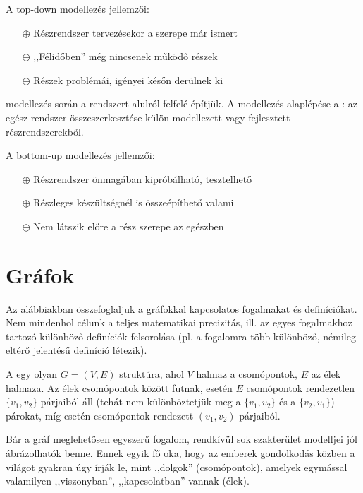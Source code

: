 A top-down modellezés jellemzői:

\begin{itemize}
\item[$\oplus$] Részrendszer tervezésekor a szerepe már ismert
\item[$\ominus$] ,,Félidőben'' még nincsenek működő részek
\item[$\ominus$] Részek problémái, igényei későn derülnek ki
\end{itemize}

\begin{definicio}
	 modellezés során a rendszert alulról felfelé építjük. A modellezés alaplépése a : az egész rendszer összeszerkesztése külön modellezett vagy fejlesztett részrendszerekből.
\end{definicio}

A bottom-up modellezés jellemzői:

\begin{itemize}
\item[$\oplus$] Részrendszer önmagában kipróbálható, tesztelhető
\item[$\oplus$] Részleges készültségnél is összeépíthető valami
\item[$\ominus$] Nem látszik előre a rész szerepe az egészben
\end{itemize}

\section{Gráfok}
\label{sec:graf}

Az alábbiakban összefoglaljuk a gráfokkal kapcsolatos fogalmakat és definíciókat. Nem mindenhol célunk a teljes matematikai precizitás, ill. az egyes fogalmakhoz tartozó különböző definíciók felsorolása (pl. a  fogalomra több különböző, némileg eltérő jelentésű definíció létezik).


\begin{definicio}
A  egy olyan $G = (V, E)$ struktúra, ahol $V$ halmaz a csomópontok, $E$ az élek halmaza. Az élek csomópontok között futnak,  esetén $E$ csomópontok rendezetlen $\{v_1, v_2\}$ párjaiból áll (tehát nem különböztetjük meg a $\{v_1, v_2\}$ és a $\{v_2, v_1\}$) párokat, míg  esetén csomópontok rendezett $(v_1, v_2)$ párjaiból.
\end{definicio}

Bár a gráf meglehetősen egyszerű fogalom, rendkívül sok szakterület modelljei jól ábrázolhatók benne. Ennek egyik fő oka, hogy az emberek gondolkodás közben a világot gyakran úgy írják le, mint ,,dolgok'' (csomópontok), amelyek egymással valamilyen ,,viszonyban'', ,,kapcsolatban'' vannak (élek).


